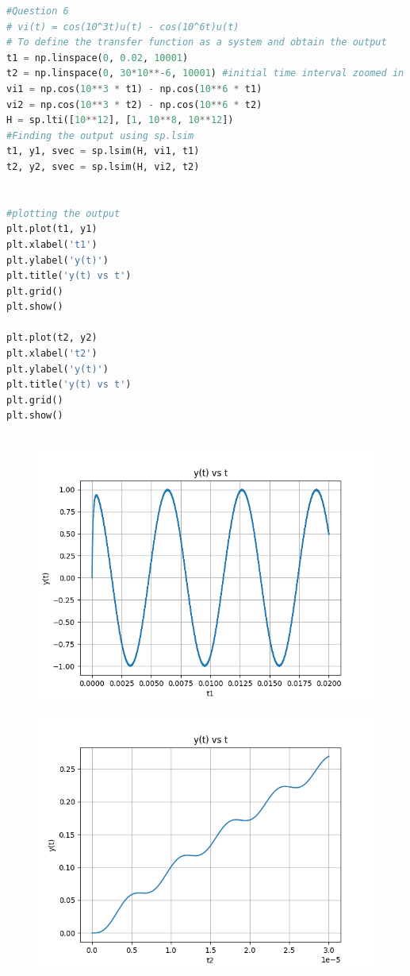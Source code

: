 \documentclass[11pt, a4paper]{article}
\begin{document}
\begin{lstlisting}[language = Python]
#Question 6
# vi(t) = cos(10^3t)u(t) - cos(10^6t)u(t)
# To define the transfer function as a system and obtain the output
t1 = np.linspace(0, 0.02, 10001)
t2 = np.linspace(0, 30*10**-6, 10001) #initial time interval zoomed in
vi1 = np.cos(10**3 * t1) - np.cos(10**6 * t1)
vi2 = np.cos(10**3 * t2) - np.cos(10**6 * t2)
H = sp.lti([10**12], [1, 10**8, 10**12])
#Finding the output using sp.lsim
t1, y1, svec = sp.lsim(H, vi1, t1)
t2, y2, svec = sp.lsim(H, vi2, t2)


#plotting the output
plt.plot(t1, y1)
plt.xlabel('t1')
plt.ylabel('y(t)')
plt.title('y(t) vs t')
plt.grid()
plt.show()

plt.plot(t2, y2)
plt.xlabel('t2')
plt.ylabel('y(t)')
plt.title('y(t) vs t')
plt.grid()
plt.show()



\end{lstlisting}

\begin{figure}[H]
     \centering
     \includegraphics[scale=0.8]{Figure_11.png}
\end{figure}

\begin{figure}[H]
     \centering
     \includegraphics[scale=0.8]{Figure_12.png}
\end{figure}
\end{document}
